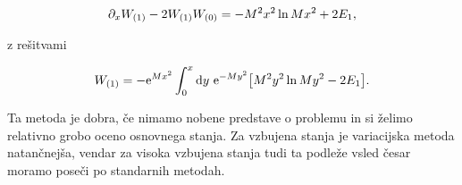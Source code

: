 \begin{equation}
	\partial_x W_{(1)} - 2W_{(1)}W_{(0)} = - M^2x^2 \ln Mx^2 + 2E_1,
\end{equation}

\ni z re\v sitvami

\begin{equation}
	W_{(1)} = -\text{e}^{Mx^2} \int_0^x \text{d} y\ \text{e}^{-My^2}\big[M^2y^2 \ln My^2 - 2E_1\big].
\end{equation}

Ta metoda je dobra, \v ce nimamo nobene predstave o problemu in si \v zelimo relativno grobo oceno osnovnega stanja. Za vzbujena stanja
je variacijska metoda natan\v cnej\v sa, vendar za visoka vzbujena stanja tudi ta podle\v ze vsled \v cesar moramo pose\v ci po
standarnih metodah.

